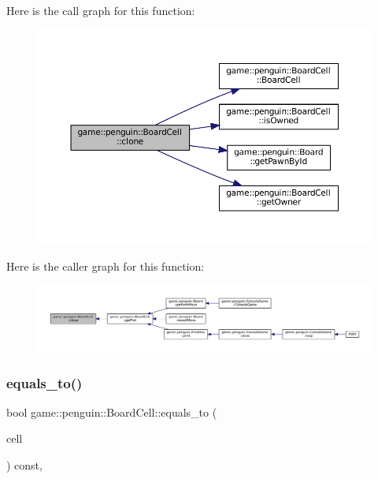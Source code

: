 Here is the call graph for this function\+:
\nopagebreak
\begin{figure}[H]
\begin{center}
\leavevmode
\includegraphics[width=350pt]{classgame_1_1penguin_1_1_board_cell_a4d3577488552bf0ba4822ac265532825_cgraph}
\end{center}
\end{figure}
Here is the caller graph for this function\+:
\nopagebreak
\begin{figure}[H]
\begin{center}
\leavevmode
\includegraphics[width=350pt]{classgame_1_1penguin_1_1_board_cell_a4d3577488552bf0ba4822ac265532825_icgraph}
\end{center}
\end{figure}
\mbox{\label{classgame_1_1penguin_1_1_board_cell_a1ed5a3134f831bef111c6294c07388bf}} 
\subsubsection{\texorpdfstring{equals\+\_\+to()}{equals\_to()}}
{\footnotesize\ttfamily bool game\+::penguin\+::\+Board\+Cell\+::equals\+\_\+to (\begin{DoxyParamCaption}\item[{const \hyperlink{classgame_1_1_abstract_board_cell}{Abstract\+Board\+Cell} \&}]{cell }\end{DoxyParamCaption}) const\hspace{0.3cm}{\ttfamily [override]}, {\ttfamily [virtual]}}



